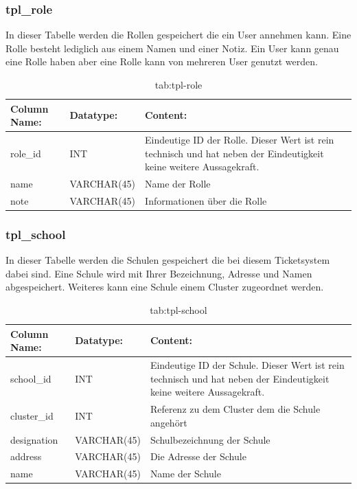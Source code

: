 \newpage

\subsubsection{tpl\_role}

In dieser Tabelle werden die Rollen gespeichert die ein User annehmen kann. Eine Rolle besteht lediglich aus einem Namen und einer Notiz. Ein User kann genau eine Rolle haben aber eine Rolle kann von mehreren User genutzt werden. 

\begin{table}[h]
	\begin{tabular}{|p{3.5cm}|p{4cm}|p{6.2cm}|}
		\hline
		\textbf{Column Name:} & \textbf{Datatype:} & \textbf{Content:}\\
		\hline
		role\_id & INT & Eindeutige ID der Rolle. Dieser Wert ist rein technisch und hat neben der Eindeutigkeit keine weitere Aussagekraft.\\
		\hline
		name & VARCHAR(45) & Name der Rolle\\
		\hline
		note & VARCHAR(45) & Informationen über die Rolle\\
		\hline
	\end{tabular}
	\caption{tab:tpl-role}
\end{table}
\label{tab:tpl_role}


\subsubsection{tpl\_school}

In dieser Tabelle werden die Schulen gespeichert die bei diesem Ticketsystem dabei sind.
Eine Schule wird mit Ihrer Bezeichnung, Adresse und Namen abgespeichert. Weiteres kann eine Schule einem Cluster zugeordnet werden. 

\begin{table}[h]
	\begin{tabular}{|p{3.5cm}|p{4cm}|p{6.2cm}|}
		\hline
		\textbf{Column Name:} & \textbf{Datatype:} & \textbf{Content:}\\
		\hline
		school\_id & INT & Eindeutige ID der Schule. Dieser Wert ist rein technisch und hat neben der Eindeutigkeit keine weitere Aussagekraft.\\
		\hline
		cluster\_id & INT & Referenz zu dem Cluster dem die Schule angehört\\
		\hline
		designation & VARCHAR(45) & Schulbezeichnung der Schule\\
		\hline
		address & VARCHAR(45) & Die Adresse der Schule\\
		\hline
		name & VARCHAR(45) & Name der Schule\\
		\hline
	\end{tabular}
	\caption{tab:tpl-school}
\end{table}
\label{tab:tpl_school}

